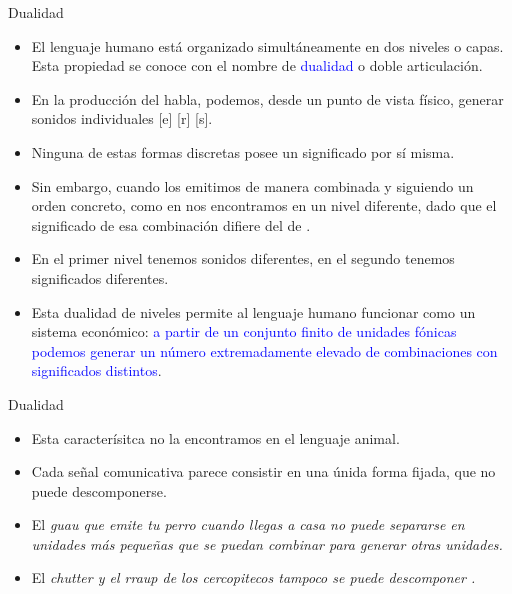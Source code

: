 \documentclass[handout]{beamer}
\begin{document}
\begin{frame}{Dualidad}

\begin{itemize}
	\item El lenguaje humano está organizado simultáneamente en dos niveles o capas. Esta propiedad se conoce con el nombre de \textcolor{blue}{dualidad} o doble articulación.
	\item En la producción del habla, podemos, desde un punto de vista físico, generar sonidos individuales [e] [r] [s].
	\item Ninguna de estas formas discretas posee un significado por sí misma. 
	\item Sin embargo, cuando los emitimos de manera combinada y siguiendo un orden concreto, como en \ipa{[ser]} nos encontramos en un nivel diferente, dado que el significado de esa combinación difiere del de \ipa{[res]}.
	\item En el primer nivel tenemos sonidos diferentes, en el segundo tenemos significados diferentes.
	\item Esta dualidad de niveles permite al lenguaje humano funcionar como un sistema económico: \textcolor{blue}{a partir de un conjunto finito de unidades fónicas podemos generar un número extremadamente elevado de combinaciones con significados distintos}.
\end{itemize}

\end{frame}

\begin{frame}{Dualidad}

\begin{itemize}
	\item Esta caracterísitca no la encontramos en el lenguaje animal.
	\item Cada señal comunicativa parece consistir en una únida forma fijada, que no puede descomponerse.
	\item El \it{guau} que emite tu perro cuando llegas a casa no puede separarse en unidades más pequeñas que se puedan combinar para generar otras unidades.
	\item El \it{chutter} y el \it{rraup} de los cercopitecos tampoco se puede descomponer .
\end{itemize}


\end{frame}
\end{document}
